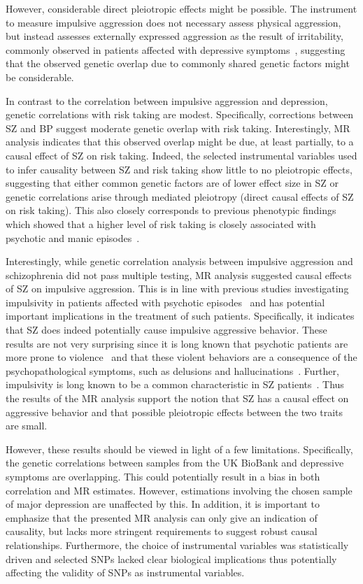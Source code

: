 However, considerable direct pleiotropic effects might be possible.
The  instrument to measure impulsive aggression does not necessary assess physical aggression, but instead assesses externally expressed aggression as the result of irritability,  commonly observed in patients affected with depressive symptoms~\cite{Dutton2013,Clark1994},
 suggesting that the observed genetic overlap due to commonly shared genetic factors might be considerable.

In contrast to the correlation between impulsive aggression and depression, genetic correlations with risk taking are modest.
Specifically, corrections between SZ and BP suggest moderate genetic overlap with risk taking.
Interestingly, MR analysis indicates that this observed overlap might be due, at least partially, to a causal effect of SZ on risk taking.
Indeed, the selected instrumental variables used to infer causality between SZ and risk taking show little to no pleiotropic effects,
 suggesting that either common genetic factors are of lower effect size in SZ or genetic correlations arise through mediated pleiotropy (direct causal effects of SZ on risk taking). 
This also closely corresponds to previous phenotypic findings which showed that a higher level of risk taking is closely associated with psychotic and manic episodes~\cite{Johnson2012,APA1994,AmericanPsychiatricAssociation2013}.

Interestingly, while genetic correlation analysis between impulsive aggression and schizophrenia did not pass multiple testing, MR analysis suggested causal effects of SZ on impulsive aggression. 
This is in line with previous studies investigating impulsivity in patients affected with psychotic episodes~\cite{Ouzir2013} and has potential important implications in the treatment of such patients.
Specifically, it indicates that SZ does indeed potentially cause impulsive aggressive behavior.
These results are not very surprising since it is long known that psychotic patients are more prone to violence~\cite{Douglas2009} and that these violent behaviors are a consequence of the psychopathological symptoms, such as delusions and hallucinations~\cite{Swanson2006}.
Further, impulsivity is long known to be a common characteristic in SZ patients~\cite{Ouzir2013}.
Thus the results of the MR analysis support the notion that SZ has a causal effect on aggressive behavior and that possible pleiotropic effects between the two traits are small.

However, these results should be viewed in light of a few limitations.
Specifically, the genetic correlations between samples from the UK BioBank and depressive symptoms are overlapping.
This could potentially result in a bias in both correlation and MR estimates.
However, estimations involving the chosen sample of major depression are unaffected by this.
In addition, it is important to emphasize that the  presented MR analysis can only give an indication of causality, but lacks more stringent requirements to suggest robust causal relationships.
Furthermore, the choice of instrumental variables was statistically driven and selected SNPs lacked  clear biological implications thus potentially affecting the validity of SNPs as instrumental variables.

